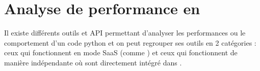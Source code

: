 \chapter{Analyse de performance en \Python}
Il existe différents outils et API permettant d'analyser les performances ou le comportement d'un code python et on peut regrouper ses outils en 2 catégories : ceux qui fonctionnent en mode \gls{SaaS} (comme \Blackfire) et ceux qui fonctionnent de manière indépendante où sont directement intégré dans \Python.